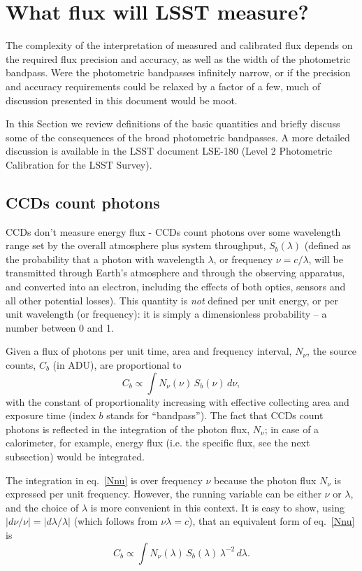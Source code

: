 \documentclass{emulateapj}
\begin{document}
\section{What flux will LSST measure?} 

The complexity of the interpretation of measured and calibrated flux depends on 
the required flux precision and accuracy, as well as the width of the photometric bandpass.
Were the photometric bandpasses infinitely narrow, or if the precision and accuracy 
requirements could be relaxed by a factor of a few, much of discussion presented in this 
document would be moot. 

In this Section we review definitions of the basic quantities and briefly discuss some of the 
consequences of the broad photometric bandpasses. A more detailed discussion is 
available in the LSST document LSE-180 (Level 2 Photometric Calibration for the LSST Survey). 


\subsection{CCDs count photons} 

CCDs don't measure energy flux - CCDs count photons over some wavelength range set 
by the overall atmosphere plus system throughput,  $S_b(\lambda)$ (defined as the probability 
that a photon with wavelength $\lambda$, or frequency $\nu=c/\lambda$,  will be 
transmitted through Earth's atmosphere and through the observing apparatus, and converted
into an electron, including the effects of both optics, sensors and all other potential losses). 
This quantity is {\it not}  defined per unit energy, or per unit wavelength (or frequency): 
it is simply a dimensionless probability -- a number between 0 and 1. 

Given a flux of photons per unit time, area and frequency interval, $N_\nu$, the 
source counts, $C_b$ (in ADU), are proportional to 
\begin{equation}
\label{Nnu}
        C_b \propto \int N_\nu(\nu) \, S_b(\nu) \, d\nu,
\end{equation}
with the constant of proportionality increasing with effective collecting area and exposure 
time (index $b$ stands for ``bandpass''). The fact that CCDs count photons is reflected in
the integration of the photon flux, $N_\nu$; in case of a calorimeter, for example, energy 
flux (i.e. the specific flux, see the next subsection) would be integrated.
 
The integration in eq.~\ref{Nnu} is over frequency $\nu$ because the photon flux $N_\nu$ 
is expressed per unit frequency. However, the running variable can be either  $\nu$ or 
$\lambda$, and the choice of $\lambda$ is more convenient in this context. It is 
easy to show, using $|d\nu/\nu| = |d\lambda / \lambda|$ (which follows from $\nu \lambda=c$),
that an equivalent form of  eq.~\ref{Nnu} is
\begin{equation}
\label{Nnu2}
         C_b\propto \int N_\nu(\lambda) \, S_b(\lambda) \, \lambda^{-2} \, d\lambda. 
\end{equation}
\end{document}
